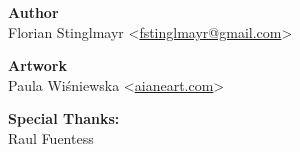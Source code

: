 \onecolumn


\vspace*{\fill}

\begin{center}
  \textbf{Author}\\
  Florian Stinglmayr
  <\href{mailto:fstinglmayr@gmail.com}{fstinglmayr@gmail.com}>

  \textbf{Artwork}\\
  Paula Wiśniewska
  <\href{http://aianeart.com}{aianeart.com}>

  \textbf{Special Thanks:}\\
  Raul Fuentess
\end{center}

\twocolumn
\newpage
